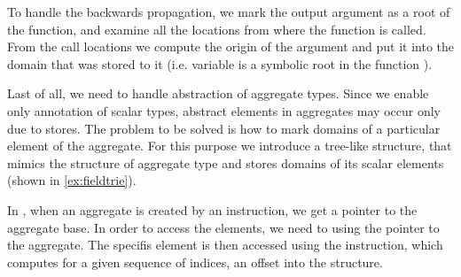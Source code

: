 To handle the backwards propagation, we mark the output argument as a root of the
function, and examine all the locations from where the function is called. From
the call locations we compute the origin of the argument and put it into the
domain that was stored to it (i.e. variable  is a symbolic root
in the function ).

Last of all, we need to handle abstraction of aggregate types. Since we enable
only annotation of scalar types, abstract elements in aggregates may occur
only due to stores. The problem to be solved is how to mark domains of a
particular element of the aggregate. For this purpose we introduce a tree-like
structure, that mimics the structure of aggregate type and stores domains of
its scalar elements (shown in \autoref{ex:fieldtrie}).

In \LLVM, when an aggregate is created by an  instruction, we get a
pointer to the aggregate base. In order to access the elements, we need to
 using the pointer to the aggregate. The specifis element is then
accessed using the  instruction, which computes for a given
sequence of indices, an offset into the structure.

